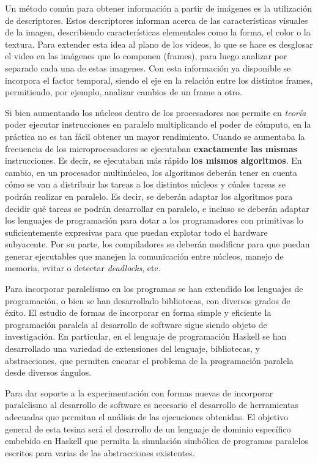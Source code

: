 Un método común para obtener información a partir de imágenes es la utilización de descriptores. Estos descriptores informan acerca de las características
visuales de la imagen, describiendo características elementales como la forma, el color o la textura.
Para extender esta idea al plano de los videos, lo que se hace es desglosar el video en las imágenes que lo componen (frames), para luego analizar por separado
cada una de estas imagenes. Con esta información ya disponible se incorpora el factor temporal, siendo el eje en la relación entre los distintos frames, permitiendo,
por ejemplo, analizar cambios de un frame a otro.

Si bien aumentando los n\'ucleos dentro de los procesadores nos
permite en \textit{teor\'ia} poder ejecutar instrucciones en paralelo
multiplicando el poder de c\'omputo, en la pr\'actica no es tan
f\'acil obtener un mayor rendimiento.  Cuando se aumentaba la
frecuencia de los microprocesadores se ejecutaban \textbf{exactamente
  las mismas} instrucciones. Es decir, se ejecutaban m\'as r\'apido
\textbf{los mismos algoritmos}. En cambio, en un procesador
multin\'ucleo, los algoritmos deber\'an tener en cuenta c\'omo se van
a distribuir las tareas a los distintos n\'ucleos y c\'uales tareas se
podr\'an realizar en paralelo. Es decir, se deber\'an adaptar
los algoritmos para decidir qu\'e tareas se podr\'an desarrollar en
paralelo, e incluso se deber\'an adaptar los lenguajes de
programaci\'on para dotar a los programadores con primitivas lo
suficientemente expresivas para que puedan explotar todo el hardware
subyacente. Por su parte, los compiladores se deber\'an modificar para
que puedan generar ejecutables que manejen la comunicaci\'on entre
n\'ucleos, manejo de memoria, evitar o detectar \textit{deadlocks},
etc.

Para incorporar paralelismo en los programas se han extendido los
lenguajes de programaci\'on, o bien se han desarrollado bibliotecas,
con diversos grados de \'exito.  El estudio de formas de incorporar
en forma simple y eficiente la programaci\'on paralela al desarrollo
de software sigue siendo objeto de investigaci\'on.  En particular, en
el lenguaje de programaci\'on Haskell se han desarrollado una variedad
de extensiones del lenguaje, bibliotecas, y abstracciones, que permiten
encarar el problema de la programaci\'on paralela desde diversos
\'angulos.

Para dar soporte a la experimentaci\'on con formas nuevas de
incorporar paralelismo al desarrollo de software es necesario el
desarrollo de herramientas adecuadas que permitan el an\'alisis de las
ejecuciones obtenidas.
El objetivo general de esta tesina ser\'a el desarrollo de un lenguaje
de dominio espec\'ifico embebido en Haskell que permita la
simulaci\'on simb\'olica de programas paralelos escritos para varias
de las abstracciones existentes.
